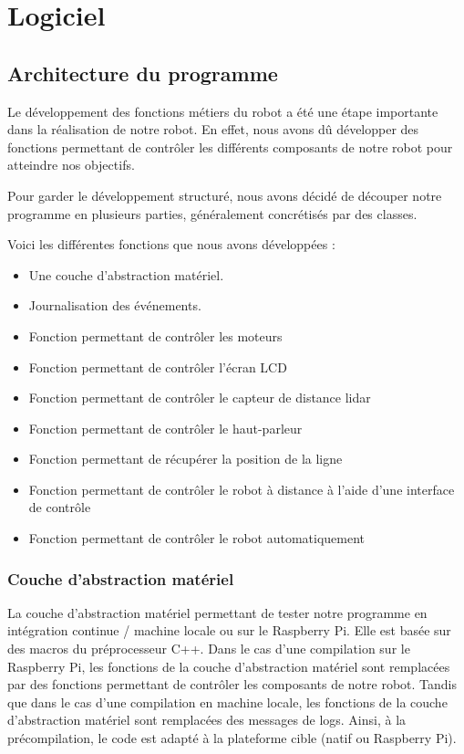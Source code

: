 \section{Logiciel}

\subsection{Architecture du programme}

Le développement des fonctions métiers du robot a été une étape importante dans la réalisation de notre robot.
En effet, nous avons dû développer des fonctions permettant de contrôler les différents composants de notre robot pour atteindre nos objectifs.

Pour garder le développement structuré, nous avons décidé de découper notre programme en plusieurs parties, généralement concrétisés par des classes.

Voici les différentes fonctions que nous avons développées :
\begin{itemize}
    \item Une couche d'abstraction matériel.
    \item Journalisation des événements.
    \item Fonction permettant de contrôler les moteurs
    \item Fonction permettant de contrôler l'écran LCD
    \item Fonction permettant de contrôler le capteur de distance lidar
    \item Fonction permettant de contrôler le haut-parleur
    \item Fonction permettant de récupérer la position de la ligne
    \item Fonction permettant de contrôler le robot à distance à l'aide d'une interface de contrôle
    \item Fonction permettant de contrôler le robot automatiquement
\end{itemize}

\subsubsection{Couche d'abstraction matériel}

La couche d'abstraction matériel permettant de tester notre programme en intégration continue / machine locale ou sur le Raspberry Pi. 
Elle est basée sur des macros du préprocesseur C++.
Dans le cas d'une compilation sur le Raspberry Pi, les fonctions de la couche d'abstraction matériel sont remplacées par des fonctions permettant de contrôler les composants de notre robot.
Tandis que dans le cas d'une compilation en machine locale, les fonctions de la couche d'abstraction matériel sont remplacées des messages de logs.
Ainsi, à la précompilation, le code est adapté à la plateforme cible (natif ou Raspberry Pi).

